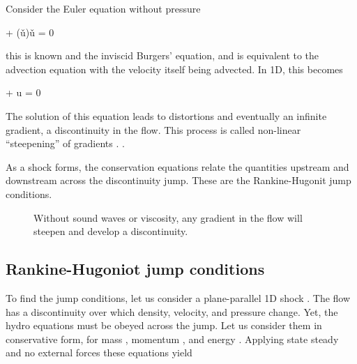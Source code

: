 Consider the Euler equation without pressure 

\beq
{}  + \left(\v{u}\cdot\del\right)\v{u} = 0 
\eeq

this is known and the inviscid Burgers' equation, and is equivalent to
the advection equation with the velocity itself being advected. In 1D,
this becomes 

\beq
{}  + u  = 0 
\eeq

The solution of this equation leads to distortions and eventually an
infinite gradient, a discontinuity in the flow. This process is called
non-linear ``steepening'' of gradients . .

As a shock forms, the conservation equations relate the quantities
upstream and downstream across the discontinuity jump. These are the Rankine-Hugonit
jump conditions.

\begin{figure}
  \begin{center}
  \end{center}
  \caption[]{Without sound waves or viscosity, any gradient in the flow
    will steepen and develop a discontinuity.}
  \label{fig:steepening}
\end{figure}


\subsection{Rankine-Hugoniot jump conditions}

To find the jump conditions, let us consider a plane-parallel 1D shock
. The flow has a discontinuity over which
density, velocity, and pressure change. Yet, the hydro equations must
be obeyed across the jump. Let us consider them in 
conservative form, for mass , momentum
, and energy
.  Applying state steady and no external forces these equations yield

